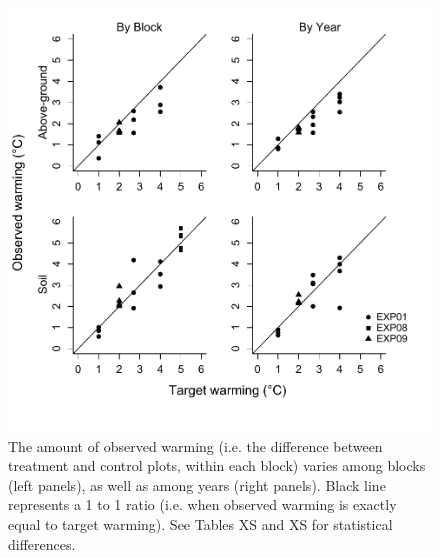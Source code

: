 \documentclass{article}
\begin{document}
 \begin{figure}[p]
     \centering
 \includegraphics{../Analyses/figures/BothWarmingbyblockyear.pdf}    
 \caption{The amount of observed warming (i.e. the difference between treatment and control plots, within each block) varies among blocks (left panels), as well as among years (right panels). Black line represents a 1 to 1 ratio (i.e. when observed warming is exactly equal to target warming). See Tables XS and XS for statistical differences.}
  \label{fig:blockyear}

 \end{figure}
\clearpage
\end{document}
